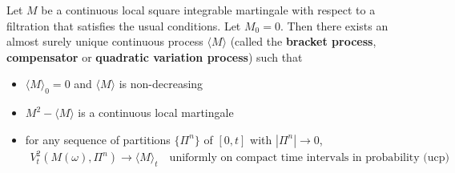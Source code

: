 \begin{theorem}
	Let $M$ be a continuous local square integrable martingale with respect to a filtration that satisfies the usual conditions. Let $M_0 = 0$. Then there exists an almost surely unique continuous process $\langle M \rangle$ (called the \textbf{bracket process}, \textbf{compensator} or \textbf{quadratic variation process}) such that
	\begin{itemize}
		\item $\langle M \rangle_0 = 0$ and $\langle M \rangle$ is non-decreasing
		\item $M^2 - \langle M \rangle$ is a continuous local martingale
		\item for any sequence of partitions $\{\Pi^n\}$ of $[0, t]$ with $|\Pi^n| \rightarrow 0$,
		\begin{align*}
			V_t^2(M(\omega), \Pi^n) \rightarrow \langle M \rangle_t \quad \text{uniformly on compact time intervals in probability (ucp)}
		\end{align*}
	\end{itemize}
\end{theorem}
